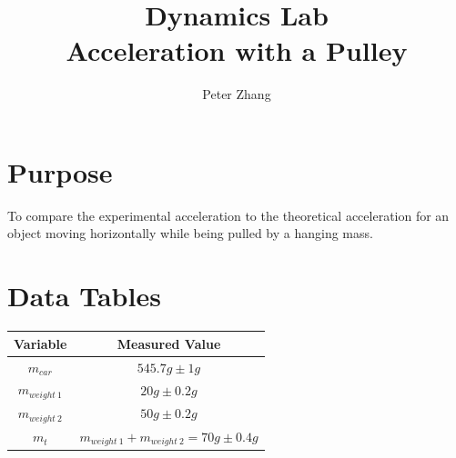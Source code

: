 \documentclass{article}
\title{Dynamics Lab\\Acceleration with a Pulley}
\author{Peter Zhang}
\begin{document}
\maketitle
\newpage
\tableofcontents
\newpage


\section{Purpose}
To compare the experimental acceleration to the theoretical acceleration for an object moving horizontally while being pulled by a hanging mass.

\section{Data Tables}

\begin{center}
	\begin{tabular}{|c|c|}
		\hline
		Variable & Measured Value\\
		\hline \hline
		$m_{car}$ & $545.7g\pm1g$\\
		\hline
		$m_{weight\ 1}$ & $20g\pm0.2g$\\
		\hline
		$m_{weight\ 2}$ & $50g\pm0.2g$\\
		\hline
		$m_{t}$ & $m_{weight\ 1} + m_{weight\ 2} = 70g\pm0.4g$\\
		\hline
	\end{tabular}
\end{center}

\begin{figure}[H]
	\centering
\end{figure}
\end{document}
